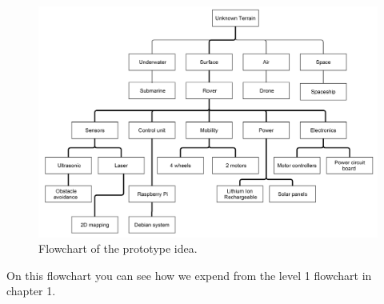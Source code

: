 \begin{figure}[H]
	\centering
	\includegraphics[scale=.1]{images/level3.png}
	\caption{Flowchart of the prototype idea.}
	\label{fig:level3}
\end{figure}

On this flowchart you can see how we expend from the level 1 flowchart in chapter 1.

\clearpage

